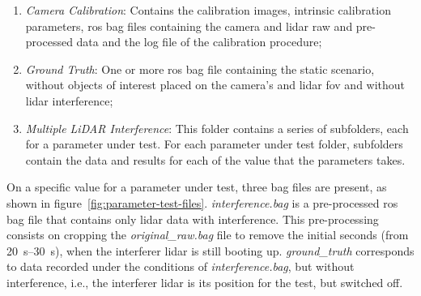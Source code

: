 \begin{enumerate}
\item \textit{Camera Calibration}: Contains the calibration images, intrinsic calibration parameters, \ac{ros} bag files containing the camera and \ac{lidar} raw and pre-processed data and the log file of the calibration procedure;
\item \textit{Ground Truth}: One or more \ac{ros} bag file containing the static scenario, without objects of interest placed on the camera's and \ac{lidar} \ac{fov} and without \ac{lidar} interference;
\item \textit{Multiple LiDAR Interference}: This folder contains a series of subfolders, each for a parameter under test. For each parameter under test folder, subfolders contain the data and results for each of the value that the parameters takes.
\end{enumerate}

On a specific value for a parameter under test, three bag files are present, as shown in figure~\ref{fig:parameter-test-files}. \textit{interference.bag} is a pre-processed \ac{ros} bag file that contains only \ac{lidar} data with interference. This pre-processing consists on cropping the \textit{original\_raw.bag} file to remove the initial seconds (from \SIrange{20}{30}{\second}), when the interferer \ac{lidar} is still booting up. \textit{ground\_truth} corresponds to data recorded under the conditions of \textit{interference.bag}, but without interference, i.e., the interferer \ac{lidar} is its position for the test, but switched off.


